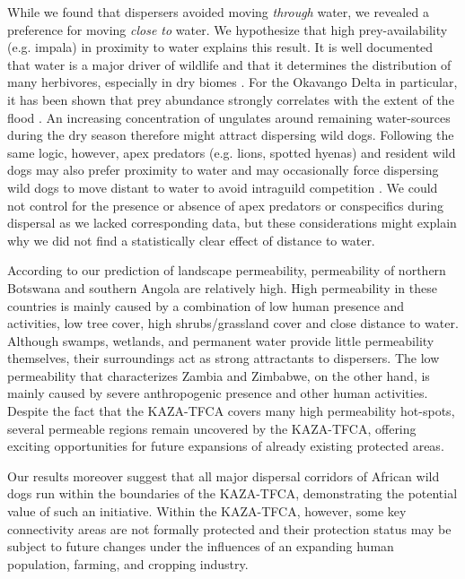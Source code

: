 \documentclass[abstract=on,10pt,a4paper,bibliography=totocnumbered]{scrartcl}
\begin{document}
While we found that dispersers avoided moving \textit{through} water, we
revealed a preference for moving \textit{close to} water. We hypothesize that
high prey-availability (e.g. impala) in proximity to water explains this result.
It is well documented that water is a major driver of wildlife and that it
determines the distribution of many herbivores, especially in dry biomes
\citep{Western.1975}. For the Okavango Delta in particular, it has been shown
that prey abundance strongly correlates with the extent of the flood
\citep{Bonyongo.2005}. An increasing concentration of ungulates around remaining
water-sources during the dry season \citep{Ogutu.2014} therefore might attract
dispersing wild dogs. Following the same logic, however, apex predators (e.g.
lions, spotted hyenas) and resident wild dogs may also prefer proximity to water
\citep{Valeix.2009} and may occasionally force dispersing wild dogs to move
distant to water \citep{Ndaimani.2016} to avoid intraguild competition
\citep{Creel.1996, Mills.1997}. We could not control for the presence or absence
of apex predators or conspecifics during dispersal as we lacked corresponding
data, but these considerations might explain why we did not find a statistically
clear effect of distance to water.

According to our prediction of landscape permeability, permeability of northern
Botswana and southern Angola are relatively high. High permeability in these
countries is mainly caused by a combination of low human presence and
activities, low tree cover, high shrubs/grassland cover and close distance to
water. Although swamps, wetlands, and permanent water provide little
permeability themselves, their surroundings act as strong attractants to
dispersers. The low permeability that characterizes Zambia and Zimbabwe, on the
other hand, is mainly caused by severe anthropogenic presence and other human
activities. Despite the fact that the KAZA-TFCA covers many high permeability
hot-spots, several permeable regions remain uncovered by the KAZA-TFCA, offering
exciting opportunities for future expansions of already existing protected
areas.

Our results moreover suggest that all major dispersal corridors of African wild
dogs run within the boundaries of the KAZA-TFCA, demonstrating the potential
value of such an initiative. Within the KAZA-TFCA, however, some key
connectivity areas are not formally protected and their protection status may be
subject to future changes under the influences of an expanding human population,
farming, and cropping industry.
\end{document}
